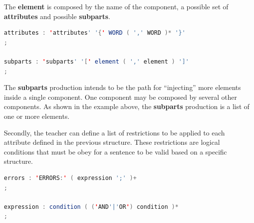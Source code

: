 
The \textbf{element} is composed by the name of the component, a possible set of \textbf{attributes} and possible \textbf{subparts}.

\begin{center}
\begin{minipage}{13cm}
\begin{lstlisting}[language=java, basicstyle=\small, label={lst:dsl_attrs_prod}, caption=DSL attributes/subparts productions]
attributes : 'attributes' '{' WORD ( ',' WORD )* '}'
;

subparts : 'subparts' '[' element ( ',' element ) ']'
;
\end{lstlisting}
\end{minipage}
\end{center}

%


The \textbf{subparts} production intends to be the path for ``injecting'' more elements inside a single component. One component may be composed by several other components. As shown in the example above, the \textbf{subparts} production is a list of one or more elements.

Secondly, the teacher can define a list of restrictions to be applied to each attribute defined in the previous structure. These restrictions are logical conditions that must be obey for a sentence to be valid based on a specific structure.

\begin{center}
\begin{minipage}{12cm}
\begin{lstlisting}[language=java, basicstyle=\small, label={lst:dsl_errors_prod}, caption=DSL errors/expression productions]
errors : 'ERRORS:' ( expression ';' )+
;

expression : condition ( ('AND'|'OR') condition )*
;
\end{lstlisting}
\end{minipage}
\end{center}


